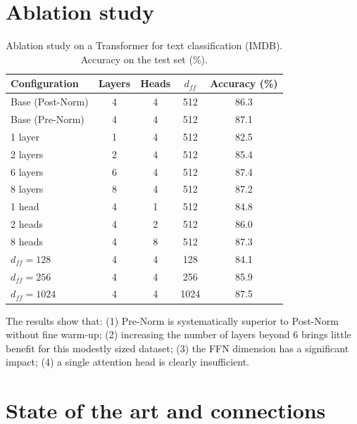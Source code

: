 \section{Ablation study}
\label{sec:transformer-ablation}

\begin{table}[htbp]
\centering
\caption{Ablation study on a Transformer for text classification (IMDB). Accuracy on the test set (\%).}
\label{tab:transformer-ablation}
\begin{tabular}{lcccc}
\toprule
\textbf{Configuration} & \textbf{Layers} & \textbf{Heads} & \textbf{$d_{ff}$} & \textbf{Accuracy (\%)} \\
\midrule
Base (Post-Norm) & 4 & 4 & 512 & 86.3 \\
Base (Pre-Norm) & 4 & 4 & 512 & 87.1 \\
\midrule
1 layer & 1 & 4 & 512 & 82.5 \\
2 layers & 2 & 4 & 512 & 85.4 \\
6 layers & 6 & 4 & 512 & 87.4 \\
8 layers & 8 & 4 & 512 & 87.2 \\
\midrule
1 head & 4 & 1 & 512 & 84.8 \\
2 heads & 4 & 2 & 512 & 86.0 \\
8 heads & 4 & 8 & 512 & 87.3 \\
\midrule
$d_{ff}=128$ & 4 & 4 & 128 & 84.1 \\
$d_{ff}=256$ & 4 & 4 & 256 & 85.9 \\
$d_{ff}=1024$ & 4 & 4 & 1024 & 87.5 \\
\bottomrule
\end{tabular}
\end{table}

\begin{remark}
The results show that: (1) Pre-Norm is systematically superior to Post-Norm without fine warm-up; (2) increasing the number of layers beyond 6 brings little benefit for this modestly sized dataset; (3) the FFN dimension has a significant impact; (4) a single attention head is clearly insufficient.
\end{remark}

\section{State of the art and connections}
\label{sec:transformers-sota}

